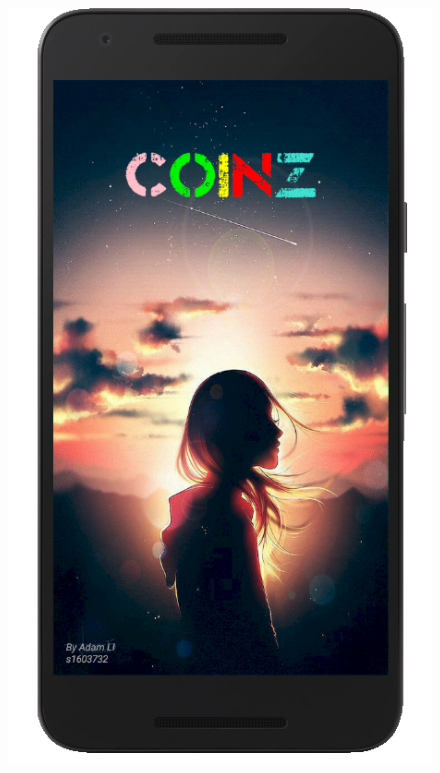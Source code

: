 \documentclass[12pt]{article}
\begin{document}
\begin{figure}
	\centering
	\includegraphics[scale=0.25]{SplashActivity.png}

\end{figure}
\end{document}
